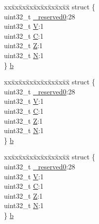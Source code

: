 \begin{DoxyCompactItemize}
\begin{tabbing}
\end{tabbing}\item 
\begin{tabbing}
xx\=xx\=xx\=xx\=xx\=xx\=xx\=xx\=xx\=\kill
struct \{\\
\>uint32\_t \hyperlink{union_a_p_s_r___type_afbce95646fd514c10aa85ec0a33db728}{\_reserved0}:28\\
\>uint32\_t \hyperlink{union_a_p_s_r___type_a8004d224aacb78ca37774c35f9156e7e}{V}:1\\
\>uint32\_t \hyperlink{union_a_p_s_r___type_a86e2c5b891ecef1ab55b1edac0da79a6}{C}:1\\
\>uint32\_t \hyperlink{union_a_p_s_r___type_a3b04d58738b66a28ff13f23d8b0ba7e5}{Z}:1\\
\>uint32\_t \hyperlink{union_a_p_s_r___type_a7e7bbba9b00b0bb3283dc07f1abe37e0}{N}:1\\
\} \hyperlink{union_a_p_s_r___type_ad6830b9357a92992d38548e1cfd4d7f3}{b}\\

\end{tabbing}\item 
\begin{tabbing}
xx\=xx\=xx\=xx\=xx\=xx\=xx\=xx\=xx\=\kill
struct \{\\
\>uint32\_t \hyperlink{union_a_p_s_r___type_afbce95646fd514c10aa85ec0a33db728}{\_reserved0}:28\\
\>uint32\_t \hyperlink{union_a_p_s_r___type_a8004d224aacb78ca37774c35f9156e7e}{V}:1\\
\>uint32\_t \hyperlink{union_a_p_s_r___type_a86e2c5b891ecef1ab55b1edac0da79a6}{C}:1\\
\>uint32\_t \hyperlink{union_a_p_s_r___type_a3b04d58738b66a28ff13f23d8b0ba7e5}{Z}:1\\
\>uint32\_t \hyperlink{union_a_p_s_r___type_a7e7bbba9b00b0bb3283dc07f1abe37e0}{N}:1\\
\} \hyperlink{union_a_p_s_r___type_a57fde0b8cbbaaba67bf0fbac8a235126}{b}\\

\end{tabbing}\item 
\begin{tabbing}
xx\=xx\=xx\=xx\=xx\=xx\=xx\=xx\=xx\=\kill
struct \{\\
\>uint32\_t \hyperlink{union_a_p_s_r___type_afbce95646fd514c10aa85ec0a33db728}{\_reserved0}:28\\
\>uint32\_t \hyperlink{union_a_p_s_r___type_a8004d224aacb78ca37774c35f9156e7e}{V}:1\\
\>uint32\_t \hyperlink{union_a_p_s_r___type_a86e2c5b891ecef1ab55b1edac0da79a6}{C}:1\\
\>uint32\_t \hyperlink{union_a_p_s_r___type_a3b04d58738b66a28ff13f23d8b0ba7e5}{Z}:1\\
\>uint32\_t \hyperlink{union_a_p_s_r___type_a7e7bbba9b00b0bb3283dc07f1abe37e0}{N}:1\\
\} \hyperlink{union_a_p_s_r___type_acb547d8b76d2f9ed5c35aec568cf2e55}{b}\\


\end{tabbing}
\end{DoxyCompactItemize}
